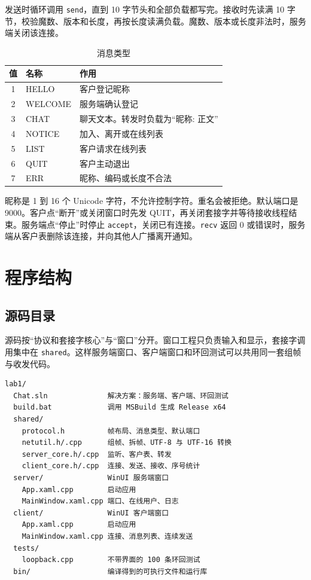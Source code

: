 \documentclass[10.5pt,a4paper,UTF8]{article}
\begin{document}
发送时循环调用 \texttt{send}，直到 10 字节头和全部负载都写完。接收时先读满 10 字节，校验魔数、版本和长度，再按长度读满负载。魔数、版本或长度非法时，服务端关闭该连接。

\begin{table}[htbp]
\centering
\caption{消息类型}
\label{tab:type}
\begin{tabular}{cll}
\toprule
值 & 名称 & 作用 \\
\midrule
1 & HELLO & 客户登记昵称 \\
2 & WELCOME & 服务端确认登记 \\
3 & CHAT & 聊天文本。转发时负载为“昵称: 正文” \\
4 & NOTICE & 加入、离开或在线列表 \\
5 & LIST & 客户请求在线列表 \\
6 & QUIT & 客户主动退出 \\
7 & ERR & 昵称、编码或长度不合法 \\
\bottomrule
\end{tabular}
\end{table}

昵称是 1 到 16 个 Unicode 字符，不允许控制字符。重名会被拒绝。默认端口是 9000。客户点“断开”或关闭窗口时先发 QUIT，再关闭套接字并等待接收线程结束。服务端点“停止”时停止 \texttt{accept}，关闭已有连接。\texttt{recv} 返回 0 或错误时，服务端从客户表删除该连接，并向其他人广播离开通知。

\section{程序结构}
\subsection{源码目录}
源码按“协议和套接字核心”与“窗口”分开。窗口工程只负责输入和显示，套接字调用集中在 \texttt{shared}。这样服务端窗口、客户端窗口和环回测试可以共用同一套组帧与收发代码。

\begin{verbatim}
lab1/
  Chat.sln              解决方案：服务端、客户端、环回测试
  build.bat             调用 MSBuild 生成 Release x64
  shared/
    protocol.h          帧布局、消息类型、默认端口
    netutil.h/.cpp      组帧、拆帧、UTF-8 与 UTF-16 转换
    server_core.h/.cpp  监听、客户表、转发
    client_core.h/.cpp  连接、发送、接收、序号统计
  server/               WinUI 服务端窗口
    App.xaml.cpp        启动应用
    MainWindow.xaml.cpp 端口、在线用户、日志
  client/               WinUI 客户端窗口
    App.xaml.cpp        启动应用
    MainWindow.xaml.cpp 连接、消息列表、连续发送
  tests/
    loopback.cpp        不带界面的 100 条环回测试
  bin/                  编译得到的可执行文件和运行库
\end{verbatim}
\end{document}
